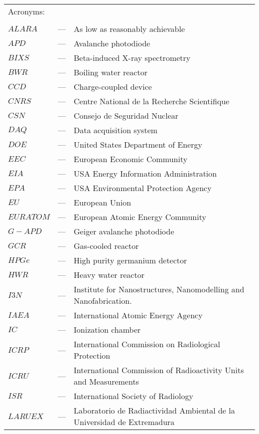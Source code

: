 \begin{longtable}{p{25mm} c p{120mm} }
\multicolumn{3}{l}{Acronyms:}\\
\\
$ALARA$ & --- & As low as reasonably achievable\\
$APD$ & --- & Avalanche photodiode\\
$BIXS$ & --- & Beta-induced X-ray spectrometry\\
$BWR$ & --- & Boiling water reactor\\
$CCD$ & --- & Charge-coupled device\\
$CNRS$ & --- & Centre National de la Recherche Scientifique\\
$CSN$ & --- & Consejo de Seguridad Nuclear\\
$DAQ$ & --- & Data acquisition system\\
$DOE$ & --- & United States Department of Energy\\
$EEC$ & --- & European Economic Community\\
$EIA$ & --- & USA Energy Information Administration\\
$EPA$ & --- & USA Environmental Protection Agency\\
$EU$ & --- & European Union\\
$EURATOM$ & --- & European Atomic Energy Community\\
$G-APD$ & --- & Geiger avalanche photodiode\\
$GCR$ & --- & Gas-cooled reactor\\
$HPGe$ & --- & High purity germanium detector\\
$HWR$ & --- & Heavy water reactor\\
$I3N$ & --- & Institute for Nanostructures, Nanomodelling and
\newline
Nanofabrication.\\
$IAEA$ & --- & International Atomic Energy Agency \\
$IC$ & --- & Ionization chamber\\
$ICRP$ & --- & International Commission on Radiological Protection \\
$ICRU$ & --- & International Commission of Radioactivity Units 
\newline
and Measurements\\
$ISR$ & --- & International Society of Radiology \\
$LARUEX$ & --- & Laboratorio de Radiactividad Ambiental de la
\newline
Universidad de Extremadura\\

\end{longtable}

